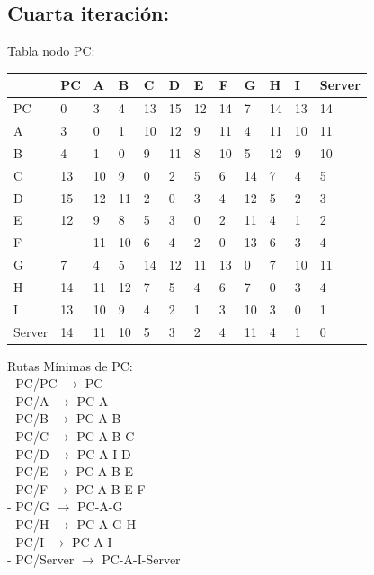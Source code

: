 \documentclass[a4paper]{article}
\begin{document}
\clearpage

\subsection{Cuarta iteración:}




\begin{table}[ht]
Tabla nodo PC:\\
\begin{tabular}{|l|l|l|l|l|l|l|l|l|l|l|l|}
\hline
       & PC & A  & B & C & D & E & F & G & H & I  & Server \\ \hline
PC     & 0  & 3  & 4 & 13& 15& 12& 14& 7 & 14& 13 & 14     \\ \hline
A      & 3  & 0  & 1 & 10& 12& 9 & 11& 4 & 11& 10 & 11     \\ \hline
B      & 4  & 1  & 0 & 9 & 11& 8 & 10& 5 & 12& 9  & 10     \\ \hline
C      & 13 & 10 & 9 & 0 & 2 & 5 & 6 & 14& 7 & 4  & 5      \\ \hline
D      & 15 & 12 & 11& 2 & 0 & 3 & 4 & 12& 5 & 2  & 3      \\ \hline
E      & 12 & 9  & 8 & 5 & 3 & 0 & 2 & 11& 4 & 1  & 2      \\ \hline
F      &    & 11 & 10& 6 & 4 & 2 & 0 & 13& 6 & 3  & 4      \\ \hline
G      & 7  & 4  & 5 & 14& 12& 11& 13& 0 & 7 & 10 & 11     \\ \hline
H      & 14 & 11 & 12& 7 & 5 & 4 & 6 & 7 & 0 & 3  & 4      \\ \hline
I      & 13 & 10 & 9 & 4 & 2 & 1 & 3 & 10& 3 & 0  & 1      \\ \hline
Server & 14 & 11 & 10& 5 & 3 & 2 & 4 & 11& 4 & 1  & 0      \\ \hline
\end{tabular}

Rutas Mínimas de PC:\\
-	PC/PC  $\rightarrow$  PC\\
-	PC/A  $\rightarrow$  PC-A\\
-	PC/B  $\rightarrow$  PC-A-B\\
-	PC/C  $\rightarrow$  PC-A-B-C\\
-	PC/D  $\rightarrow$  PC-A-I-D\\
-	PC/E  $\rightarrow$  PC-A-B-E\\
-	PC/F  $\rightarrow$  PC-A-B-E-F\\
-	PC/G  $\rightarrow$  PC-A-G\\
-	PC/H  $\rightarrow$  PC-A-G-H\\
-	PC/I  $\rightarrow$  PC-A-I\\
-	PC/Server  $\rightarrow$  PC-A-I-Server\\
\end{table}
\end{document}
